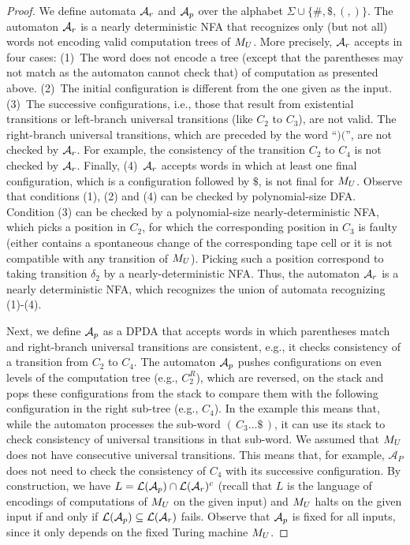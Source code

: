 \documentclass{CSML}
\newcommand{\aut}{\mathcal{A}}
\newcommand{\lang}{\mathcal{L}}
\begin{document}
\begin{proof}
We define automata $\mathcal{A}_r$ and $\mathcal{A}_p$ over the alphabet $\Sigma \cup \{\#,\$,(,)\}$. 
The automaton $\mathcal{A}_r$ is a nearly deterministic NFA that recognizes only (but not all) words 
not encoding valid computation trees of ${M}_U$.
More precisely, $\mathcal{A}_r$ accepts in four cases:
(1)~The word does not encode a tree (except that the parentheses may not match as the automaton cannot check that) 
of computation as presented above.
(2)~The initial configuration is different from the one given as the input. 
(3)~The successive configurations, i.e., those that
result from existential transitions or left-branch universal transitions (like $C_2$ to $C_{3}$), are not valid. 
The right-branch universal transitions, which are preceded by the word ``$)($'', are not checked by $\mathcal{A}_r$. 
For example, the consistency of the transition $C_{2}$ to  $C_4$ is not checked by $\mathcal{A}_r$.
Finally, (4)~$\mathcal{A}_r$ accepts words in which at least one final configuration, which is a configuration followed by $\$$, is not final for ${M}_U$.
Observe that conditions (1), (2) and (4) can be checked by polynomial-size DFA. Condition (3) can be checked by a polynomial-size nearly-deterministic NFA, which 
picks a position in $C_2$, for which the corresponding position in $C_3$ is faulty (either contains a spontaneous change of the corresponding tape cell or
 it is not compatible with any transition of ${M}_U$). Picking such a position correspond to taking transition $\delta_2$ by a nearly-deterministic NFA.
 Thus, the automaton $\mathcal{A}_r$ is a nearly deterministic NFA, which recognizes the union of automata recognizing (1)-(4).
 
Next, we define $\mathcal{A}_p$ as a DPDA that accepts words in which parentheses match and right-branch universal transitions 
are consistent, e.g., it checks consistency of a transition from $C_2$ to $C_{4}$.
The automaton $\mathcal{A}_p$ pushes configurations on even levels of the computation tree (e.g., $C_2^R$), which are reversed, on the stack  and 
pops these configurations from the stack to compare them with the following configuration in the right sub-tree (e.g., $C_{4}$). 
In the example this means that, while the automaton processes 
the sub-word $\left(\, C_{3} \ldots \$\,\right)$, it can use its stack to check consistency of universal transitions in that sub-word.
We assumed that ${M}_U$ does not have consecutive universal transitions. This means that, for example, $\aut_P$ does not need to check 
the consistency of $C_{4}$ with its successive configuration.
By construction, we have $L = \lang(\Ap) \cap \lang(\Ar)^c$ (recall that $L$ is the language of encodings of computations of ${M}_U$ on the given input) and 
${M}_U$ halts on the given input if and only if $\lang(\Ap) \subseteq \lang(\Ar)$ fails.
Observe that $\mathcal{A}_p$ is fixed for all inputs, since it only depends on the fixed Turing machine ${M}_U$.\end{proof}
\end{document}
